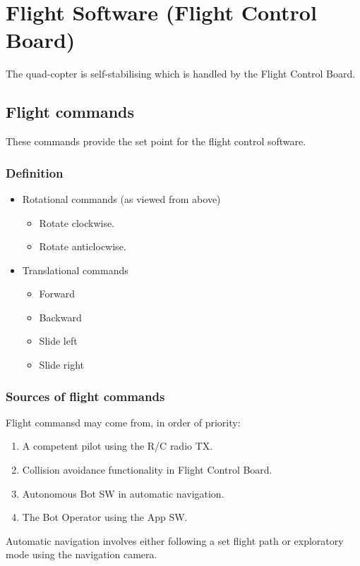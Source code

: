 \documentclass[a4paper]{article}
\begin{document}
\section{Flight Software (Flight Control Board)}
The quad-copter is self-stabilising which is handled by the Flight Control Board.

  \subsection{Flight commands}
  These commands provide the set point for the flight control software.
  \subsubsection{Definition}
  \label{sec:flightcmd-definition}
  \begin{itemize}
    \item Rotational commands (as viewed from above)
      \begin{itemize}
        \item Rotate clockwise.
        \item Rotate anticlocwise.
      \end{itemize}
      \item Translational commands
        \begin{itemize}
          \item Forward
          \item Backward
          \item Slide left
          \item Slide right
        \end{itemize}
  \end{itemize}

  \subsubsection{Sources of flight commands}
  \label{sec:flight-cmd-src}
  Flight commansd may come from, in order of priority:
  \begin{enumerate}
    \item A competent pilot using the R/C radio TX.
    \item Collision avoidance functionality in Flight Control Board.
    \item Autonomous Bot SW in automatic navigation.
    \item The Bot Operator using the App SW.
  \end{enumerate}
  Automatic navigation involves either following a set flight path or exploratory mode using the navigation camera.
\end{document}
